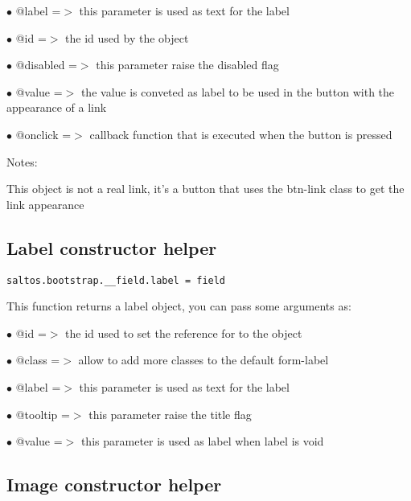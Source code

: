 \documentclass[a4paper]{book}
\begin{document}
\begin{compactitem}
\item[\color{myblue}$\bullet$] @label    =$>$ this parameter is used as text for the label
\item[\color{myblue}$\bullet$] @id       =$>$ the id used by the object
\item[\color{myblue}$\bullet$] @disabled =$>$ this parameter raise the disabled flag
\item[\color{myblue}$\bullet$] @value    =$>$ the value is conveted as label to be used in the button with the appearance of a link
\item[\color{myblue}$\bullet$] @onclick  =$>$ callback function that is executed when the button is pressed
\end{compactitem}

Notes:

This object is not a real link, it's a button that uses the btn-link class to get the link
appearance

\hypertarget{toc455}{}
\subsection{Label constructor helper}

\begin{lstlisting}
saltos.bootstrap.__field.label = field
\end{lstlisting}

This function returns a label object, you can pass some arguments as:

\begin{compactitem}
\item[\color{myblue}$\bullet$] @id      =$>$ the id used to set the reference for to the object
\item[\color{myblue}$\bullet$] @class   =$>$ allow to add more classes to the default form-label
\item[\color{myblue}$\bullet$] @label   =$>$ this parameter is used as text for the label
\item[\color{myblue}$\bullet$] @tooltip =$>$ this parameter raise the title flag
\item[\color{myblue}$\bullet$] @value   =$>$ this parameter is used as label when label is void
\end{compactitem}

\hypertarget{toc456}{}
\subsection{Image constructor helper}
\end{document}
